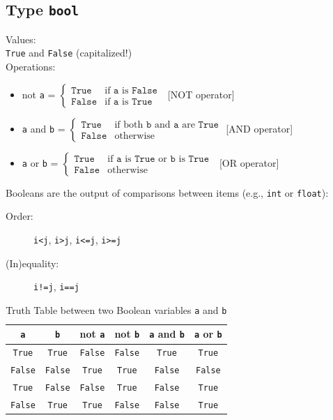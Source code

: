 \documentclass[t,handout,9pt]{beamer}
\begin{document}
\subsection{Type \texttt{bool}}
\begin{frame}
Values:\\
\qquad \texttt{True} and \texttt{False} (capitalized!)\\
Operations:\\
\begin{itemize}
	\item not \texttt{a} = $\begin{cases}
		\texttt{True} & \text{if} \texttt{ a } \text{is} \texttt{ False }\\
		\texttt{False} & \text{if} \texttt{ a } \text{is} \texttt{ True }
	\end{cases}$ \hfill [NOT operator]
	\item \texttt{a} and \texttt{b} = $\begin{cases}
		\texttt{True} & \text{if both} \texttt{ b } \text{and} \texttt{ a } \text{are} \texttt{ True}\\
		\texttt{False} & \text{otherwise}
	\end{cases}$ \hfill [AND operator]
	\item \texttt{a} or \texttt{b} = $\begin{cases}
		\texttt{True} & \text{if} \texttt{ a } \text{is} \texttt{ True } \text{or} \texttt{ b } \text{is} \texttt{ True }\\
		\texttt{False} & \text{otherwise}
	\end{cases}$ \hfill [OR operator]
\end{itemize}
Booleans are the output of comparisons between items (e.g., \texttt{int} or \texttt{float}):
\begin{description}
	\item[Order:] \texttt{i<j}, \texttt{i>j}, \texttt{i<=j}, \texttt{i>=j}
	\item[(In)equality:] \texttt{i!=j}, \texttt{i==j}
\end{description}
\end{frame}
%
\begin{frame}
\vfill
\begin{table}[]
\centering
\caption{Truth Table between two Boolean variables \texttt{a} and \texttt{b}}
\begin{tabular}{@{}cccccc@{}}
\toprule
\texttt{a}     & \texttt{b}     & not \texttt{a} & not \texttt{b} & \texttt{a} and \texttt{b} & \texttt{a} or \texttt{b} \\ \midrule
\texttt{True}  & \texttt{True}  & \texttt{False} & \texttt{False} & \texttt{True}    & \texttt{True}   \\
\texttt{False} & \texttt{False} & \texttt{True}  & \texttt{True}  & \texttt{False}   & \texttt{False}  \\
\texttt{True}  & \texttt{False} & \texttt{False} & \texttt{True}  & \texttt{False}   & \texttt{True}   \\
\texttt{False} & \texttt{True}  & \texttt{True}  & \texttt{False} & \texttt{False}   & \texttt{True}   \\ \bottomrule
\end{tabular}
\end{table}
\vfill
\end{frame}
%
\end{document}
